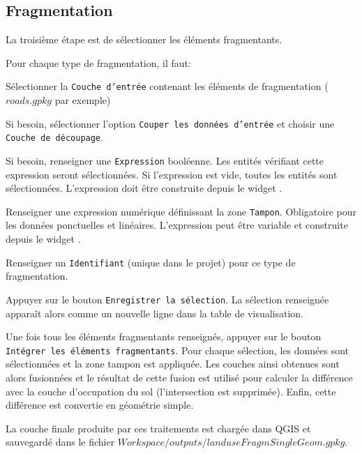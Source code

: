 \documentclass[11pt]{article}
\let\tempone\itemize
\let\temptwo\enditemize
\renewenvironment{enumerate}{\tempone\addtolength{\itemsep}{-0.5\baselineskip}}{\temptwo}
\begin{document}
\subsection{Fragmentation}

La troisième étape est de sélectionner les éléments fragmentants.

Pour chaque type de fragmentation, il faut:
\begin{enumerate}
    \item Sélectionner la \texttt{Couche d'entrée} contenant les éléments de fragmentation ($roads.gpkg$ par exemple)
    \item Si besoin, sélectionner l'option \texttt{Couper les données d'entrée} et choisir une \texttt{Couche de découpage}.
    \item Si besoin, renseigner une \texttt{Expression} booléenne. Les entités vérifiant cette expression seront sélectionnées. Si l'expression est vide, toutes les entités sont sélectionnées. L'expression doit être construite depuis le widget .
    \item Renseigner une expression numérique définissant la zone \texttt{Tampon}. Obligatoire pour les données ponctuelles et linéaires. L'expression peut être variable et construite depuis le widget .
    \item Renseigner un \texttt{Identifiant} (unique dans le projet) pour ce type de fragmentation.
    \item Appuyer sur le bouton \texttt{Enregistrer la sélection}. La sélection renseignée apparaît alors comme un nouvelle ligne dans la table de visualisation.
\end{enumerate}

Une fois tous les éléments fragmentants renseignés, appuyer sur le bouton \texttt{Intégrer les éléments fragmentants}. Pour chaque sélection, les données sont sélectionnées et la zone tampon est appliquée. Les couches ainsi obtenues sont alors fusionnées et le résultat de cette fusion est utilisé pour calculer la différence avec la couche d'occupation du sol (l'intersection est supprimée). Enfin, cette différence est convertie en géométrie simple.

La couche finale produite par ces traitements est chargée dans QGIS et sauvegardé dans le fichier $Workspace/outputs/landuseFragmSingleGeom.gpkg$.
\end{document}
